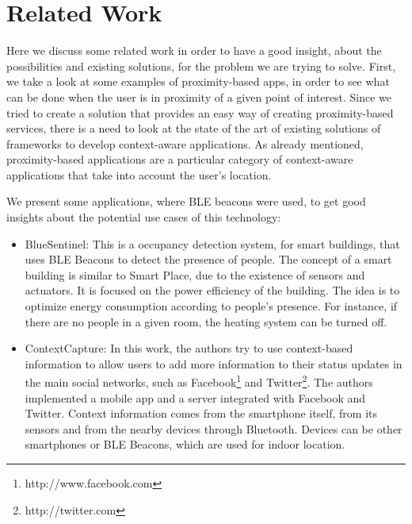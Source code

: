 
\section{Related Work}
\label{sec:related_work}
Here we discuss some related work in order to have a good insight, about the possibilities and existing solutions, for the problem we are trying to solve.
First, we take a look at some examples of proximity-based apps, in order to see what can be done when the user is in proximity of a given point of interest.
Since we tried to create a solution that provides an easy way of creating proximity-based services, there is a need to look at the state of the art of existing solutions of frameworks to develop context-aware applications. As already mentioned, proximity-based applications are a particular category of context-aware applications that take into account the user's location.

We present some
applications, where \gls{BLE} beacons were used, to get good insights about the potential use cases of this
technology:
\begin{itemize}
  \item BlueSentinel\cite{Conte2014}:
  This is a
  occupancy detection system, for smart buildings,
  that uses \gls{BLE} Beacons to detect the presence of
  people. The concept of a smart building
  is similar to Smart Place,
  due to the existence of sensors and actuators.
  It is focused on the power efficiency of the
  building. The idea is to optimize energy
  consumption according to people's presence.
  For instance, if there are no people in a given room,
  the heating system can be turned off.
  \item ContextCapture\cite{Antila2011}:
  In this work, the authors try to use
  context-based information to allow users to
  add more information to their status updates
  in the main social networks, such as
  Facebook\footnote{http://www.facebook.com} and
  Twitter\footnote{http://twitter.com}.
  The authors implemented a mobile app and a
  server integrated with Facebook and Twitter.
  Context information comes from the smartphone itself,
  from its sensors and from the nearby devices through
  Bluetooth.
  Devices can be other smartphones or \gls{BLE} Beacons, which
  are used for indoor location.
\end{itemize}

